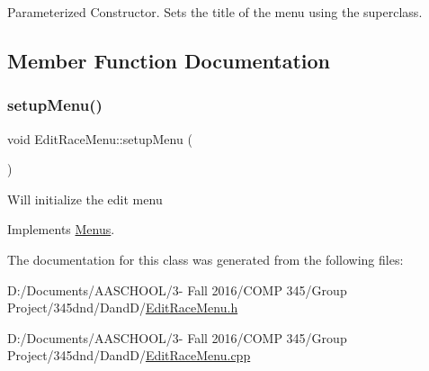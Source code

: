 Parameterized Constructor. Sets the title of the menu using the superclass. 

\subsection{Member Function Documentation}
\hypertarget{class_edit_race_menu_ad2d2cba34426c68f678b1c04cddd2aed}{}\label{class_edit_race_menu_ad2d2cba34426c68f678b1c04cddd2aed} 
\subsubsection{\texorpdfstring{setup\+Menu()}{setupMenu()}}
{\footnotesize\ttfamily void Edit\+Race\+Menu\+::setup\+Menu (\begin{DoxyParamCaption}{ }\end{DoxyParamCaption})\hspace{0.3cm}{\ttfamily [virtual]}}

Will initialize the edit menu 

Implements \hyperlink{class_menus}{Menus}.



The documentation for this class was generated from the following files\+:\begin{DoxyCompactItemize}
\item 
D\+:/\+Documents/\+A\+A\+S\+C\+H\+O\+O\+L/3-\/ Fall 2016/\+C\+O\+M\+P 345/\+Group Project/345dnd/\+Dand\+D/\hyperlink{_edit_race_menu_8h}{Edit\+Race\+Menu.\+h}\item 
D\+:/\+Documents/\+A\+A\+S\+C\+H\+O\+O\+L/3-\/ Fall 2016/\+C\+O\+M\+P 345/\+Group Project/345dnd/\+Dand\+D/\hyperlink{_edit_race_menu_8cpp}{Edit\+Race\+Menu.\+cpp}\end{DoxyCompactItemize}

